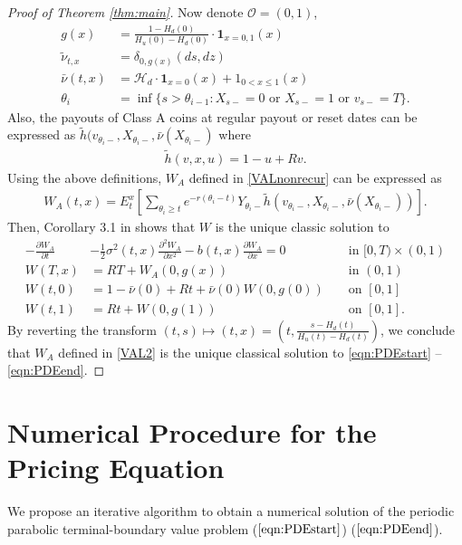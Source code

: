 \documentclass[final,pdftex]{ectaart}
\newcommand{\der}[2]{\ensuremath{\frac{\partial #1}{\partial #2}}}
\newcommand{\dder}[2]{\ensuremath{\frac{\partial^2 #1}{\partial #2^2}}}
\theoremstyle{plain}
\begin{document}
\begin{appendices}
\begin{proof}[Proof of Theorem \ref{thm:main}]
	Now denote $\mathcal{O}=(0,1)$,
	\begin{align*}
		g(x)&=\frac{1-H_d(0)}{H_u(0)-H_d(0)}\cdot\mathbf{1}_{x=0,1}(x)\\
		\tilde{\nu}_{t,x}&=\delta_{0,g(x)}(ds,dz)\\
		\bar{\nu}(t,x)&=\mathcal{H}_d\cdot \mathbf{1}_{x=0}(x)+1_{0<x\le 1}(x)\\
		\theta_i&=\inf\{s>\theta_{i-1}:X_{s-}=0\text{ or }X_{s-}=1\text{ or }v_{s-}=T\}.
	\end{align*}
	Also, the payouts of Class A coins at regular payout or reset dates can be expressed as $\tilde{h}(v_{\theta_i-},X_{\theta_i-},\bar{\nu}(X_{\theta_i-})$ where
	\begin{align*}
		\tilde{h}(v,x,u)=1-u+Rv.
	\end{align*}
	Using the above definitions, $W_A$ defined in \eqref{VALnonrecur} can be expressed as
	\begin{align*}
		W_A(t,x)=E_t^x\left[\sum_{\theta_i\ge t}e^{-r(\theta_i-t)}Y_{\theta_i-}\tilde{h}(v_{\theta_i-},X_{\theta_i-},\bar{\nu}(X_{\theta_i-}))\right].
	\end{align*}
	Then, Corollary 3.1 in \cite{dai_stochastic_2017} shows that $W$ is the unique classic solution to
	\begin{align*}
		-\der{W_A}{t}&-\frac{1}{2}\sigma^2(t,x)\dder{W_A}{x}-b(t,x)\der{W_A}{x}=0 && \text{ in }[0,T)\times(0,1)\\
		W(T,x)&=RT+W_A(0,g(x)) && \text{ in }(0,1)\\
		W(t,0)&=1-\bar{\nu}(0)+Rt+\bar{\nu}(0)W(0,g(0)) && \text{ on }[0,1]\\
		W(t,1)&=Rt+W(0,g(1)) && \text{ on }[0,1].
	\end{align*}
	By reverting the transform $(t,s)\mapsto(t,x)=\left(t,\frac{s-H_d(t)}{H_u(t)-H_d(t)}\right)$, we conclude that $W_A$ defined in \eqref{VAL2} is the unique classical solution to \eqref{eqn:PDEstart} -- \eqref{eqn:PDEend}.
\end{proof}

\section{Numerical Procedure for the Pricing Equation}\label{subsec:Numerical-Procedure-for}

We propose an iterative algorithm to obtain a numerical solution of the periodic parabolic terminal-boundary value problem ($\ref{eqn:PDEstart}$) \textendash{} ($\ref{eqn:PDEend}$).


\end{appendices}
\end{document}
